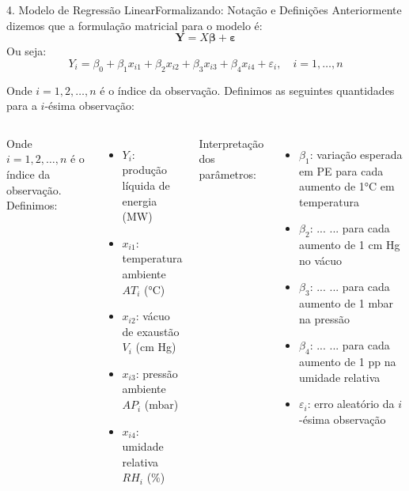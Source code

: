 \documentclass[10pt,aspectratio=169]{beamer}
\begin{document}
\begin{frame}{4. Modelo de Regressão Linear}{Formalizando: Notação e Definições}
    Anteriormente dizemos que a formulação matricial para o modelo é:
    $$\mathbf{Y} = X\boldsymbol{\beta} + \boldsymbol{\varepsilon}$$
    Ou seja: 
    $$Y_i = \beta_0 + \beta_1 x_{i1} + \beta_2 x_{i2} + \beta_3 x_{i3} + \beta_4 x_{i4} + \varepsilon_i, \quad i = 1, \ldots, n$$
    
    Onde $i = 1, 2, \ldots, n$ é o índice da observação. Definimos as seguintes quantidades para a $i$-ésima observação:
\begin{columns}[t]


Onde $i = 1,2,\ldots,n$ é o índice da observação. 
Definimos:

\begin{itemize}
\item $Y_i$: produção líquida de energia (MW)
\item $x_{i1}$: temperatura ambiente $AT_i$ (°C)
\item $x_{i2}$: vácuo de exaustão $V_i$ (cm Hg)
\item $x_{i3}$: pressão ambiente $AP_i$ (mbar)
\item $x_{i4}$: umidade relativa $RH_i$ (\%)
\end{itemize}


Interpretação dos parâmetros:

\begin{itemize}
\item $\beta_1$: variação esperada em PE para cada aumento de 1°C em temperatura
\item $\beta_2$: ... ...  para cada aumento de 1 cm Hg no vácuo
\item $\beta_3$: ... ... para cada aumento de 1 mbar na pressão
\item $\beta_4$: ... ... para cada aumento de 1 pp na umidade relativa
\item $\varepsilon_i$: erro aleatório da $i$-ésima observação

\end{itemize}
\end{columns}
\end{frame}
\end{document}
